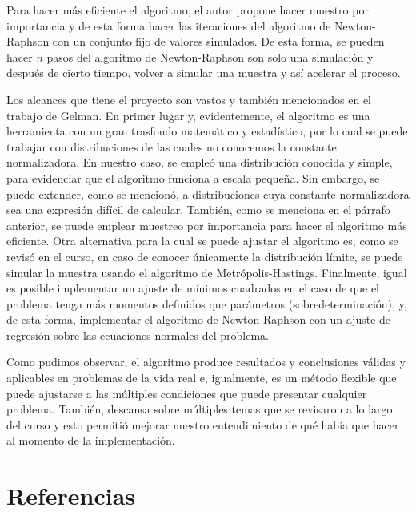 \documentclass[9pt,twocolumn,twoside,]{pnas-new}
\begin{document}
Para hacer más eficiente el algoritmo, el autor propone hacer muestro
por importancia y de esta forma hacer las iteraciones del algoritmo de
Newton-Raphson con un conjunto fijo de valores simulados. De esta forma,
se pueden hacer \(n\) pasos del algoritmo de Newton-Raphson son solo una
simulación y después de cierto tiempo, volver a simular una muestra y
así acelerar el proceso.

Los alcances que tiene el proyecto son vastos y también mencionados en
el trabajo de Gelman. En primer lugar y, evidentemente, el algoritmo es
una herramienta con un gran trasfondo matemático y estadístico, por lo
cual se puede trabajar con distribuciones de las cuales no conocemos la
constante normalizadora. En nuestro caso, se empleó una distribución
conocida y simple, para evidenciar que el algoritmo funciona a escala
pequeña. Sin embargo, se puede extender, como se mencionó, a
distribuciones cuya constante normalizadora sea una expresión difícil de
calcular. También, como se menciona en el párrafo anterior, se puede
emplear muestreo por importancia para hacer el algoritmo más eficiente.
Otra alternativa para la cual se puede ajustar el algoritmo es, como se
revisó en el curso, en caso de conocer únicamente la distribución
límite, se puede simular la muestra usando el algoritmo de
Metrópolis-Hastings. Finalmente, igual es posible implementar un ajuste
de mínimos cuadrados en el caso de que el problema tenga más momentos
definidos que parámetros (sobredeterminación), y, de esta forma,
implementar el algoritmo de Newton-Raphson con un ajuste de regresión
sobre las ecuaciones normales del problema.

Como pudimos observar, el algoritmo produce resultados y conclusiones
válidas y aplicables en problemas de la vida real e, igualmente, es un
método flexible que puede ajustarse a las múltiples condiciones que
puede presentar cualquier problema. También, descansa sobre múltiples
temas que se revisaron a lo largo del curso y esto permitió mejorar
nuestro entendimiento de qué había que hacer al momento de la
implementación.

\hypertarget{referencias}{%
\section*{Referencias}\label{referencias}}

\showmatmethods
\showacknow
\pnasbreak
\end{document}
